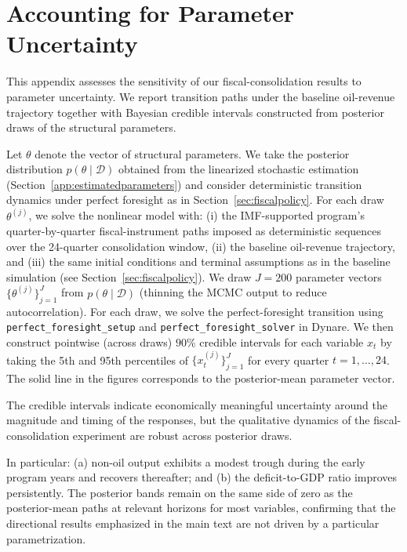 \documentclass[12pt]{article}
\begin{document}
\section{Accounting for Parameter Uncertainty}\label{app:uncertainty}

This appendix assesses the sensitivity of our fiscal-consolidation results to parameter uncertainty. We report transition paths under the baseline oil-revenue trajectory together with Bayesian credible intervals constructed from posterior draws of the structural parameters. 

Let $\theta$ denote the vector of structural parameters. We take the posterior distribution $p(\theta \mid \mathcal{D})$ obtained from the linearized stochastic estimation (Section~\ref{app:estimatedparameters}) and consider deterministic transition dynamics under perfect foresight as in Section~\ref{sec:fiscalpolicy}. For each draw $\theta^{(j)}$, we solve the nonlinear model with: (i) the IMF-supported program’s quarter-by-quarter fiscal-instrument paths imposed as deterministic sequences over the 24-quarter consolidation window, (ii) the baseline oil-revenue trajectory, and (iii) the same initial conditions and terminal assumptions as in the baseline simulation (see Section~\ref{sec:fiscalpolicy}). We draw $J=200$ parameter vectors $\{\theta^{(j)}\}_{j=1}^{J}$ from $p(\theta \mid \mathcal{D})$ (thinning the MCMC output to reduce autocorrelation). For each draw, we solve the perfect-foresight transition using \texttt{perfect\_foresight\_setup} and \texttt{perfect\_foresight\_solver} in Dynare. We then construct pointwise (across draws) $90\%$ credible intervals for each variable $x_t$ by taking the 5th and 95th percentiles of $\{x_t^{(j)}\}_{j=1}^{J}$ for every quarter $t=1,\dots,24$. The solid line in the figures corresponds to the posterior-mean parameter vector.

The credible intervals indicate economically meaningful uncertainty around the magnitude and timing of the responses, but the qualitative dynamics of the fiscal-consolidation experiment are robust across posterior draws. 

In particular: (a) non-oil output exhibits a modest trough during the early program years and recovers thereafter; and (b) the deficit-to-GDP ratio improves persistently. The posterior bands remain on the same side of zero as the posterior-mean paths at relevant horizons for most variables, confirming that the directional results emphasized in the main text are not driven by a particular parametrization.
\end{document}

